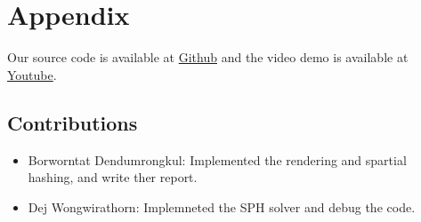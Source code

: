 \documentclass[a4paper]{article}
\begin{document}
\nocite{*}
\printbibliography

\section*{Appendix}

Our source code is available at \href{https://github.com/MasterIceZ/SPH-FluidSimulation}{Github} and the video demo is available at \href{https://youtu.be/i02nvo1WltE}{Youtube}.

\subsection{Contributions}

\begin{itemize}
  \item Borworntat Dendumrongkul: Implemented the rendering and spartial hashing, and write ther report.
  \item Dej Wongwirathorn: Implemneted the SPH solver and debug the code.
\end{itemize}
\end{document}
